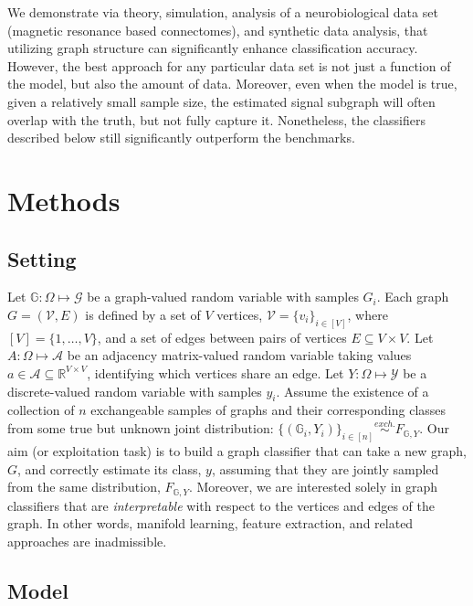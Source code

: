 \documentclass[10pt,journal,cspaper,compsoc]{IEEEtran}
\newcommand{\GG}{\mathbb{G}}
\providecommand{\mc}[1]{\mathcal{#1}}
\newcommand{\Real}{\mathbb{R}}
\begin{document}
We demonstrate via theory, simulation, analysis of a neurobiological data set (magnetic resonance based connectomes), and synthetic data analysis, that utilizing graph structure can significantly enhance classification accuracy.  However, the best approach for any particular data set is not just a function of the model, but also the amount of data.  Moreover, even when the model is true, given a relatively small sample size, the estimated signal subgraph will often overlap with the truth, but not fully capture it.  Nonetheless, the classifiers described below still significantly outperform the benchmarks.

\section{Methods} %
\label{sec:methods}


\subsection{Setting}

Let $\GG: \Omega \mapsto \mc{G}$ be a graph-valued random variable with samples $G_i$.  Each graph $G=(\mc{V},E)$ is defined by a set of $V$ vertices, $\mc{V}=\{v_i\}_{i \in [V]}$, where $[V]=\{1,\ldots, V\}$, and a set of  edges between pairs of vertices $E \subseteq V \times V$. Let $A: \Omega \mapsto \mc{A}$ be an adjacency matrix-valued random variable taking values $a \in \mc{A} \subseteq \Real^{V \times V}$, identifying which vertices share an edge. Let $Y:\Omega \mapsto \mc{Y}$ be a discrete-valued random variable with samples $y_i$.  Assume the existence of a collection of $n$ exchangeable samples of graphs and their corresponding classes from some true but unknown joint distribution: $\{(\GG_i,Y_i)\}_{i \in [n]} \overset{exch.}{\sim} F_{\GG,Y}$. Our aim (or exploitation task) is to build a graph classifier that can take a new graph, $G$, and correctly estimate its class, $y$, assuming that they are jointly sampled from the same distribution, $F_{\GG,Y}$.  Moreover, we are interested solely in graph classifiers that are \emph{interpretable} with respect to the vertices and edges of the graph. In other words, manifold learning, feature extraction, and related approaches are inadmissible.  

\subsection{Model} %
\label{sub:model}
\end{document}
